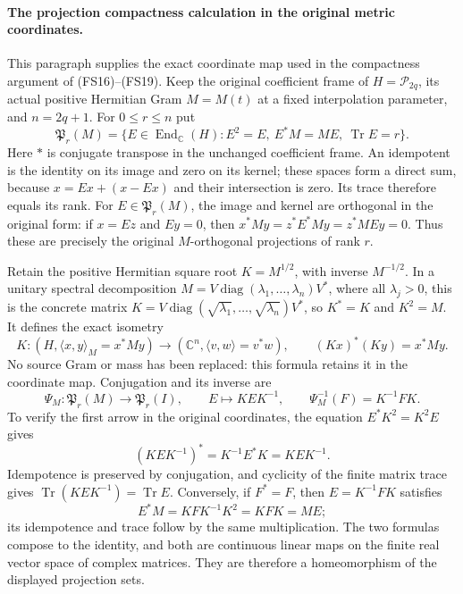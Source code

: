 \paragraph{The projection compactness calculation in the original metric coordinates.}
This paragraph supplies the exact coordinate map used in the compactness
argument of (FS16)--(FS19). Keep the original coefficient frame of
$H=\mathcal P_{2q}$, its actual positive Hermitian Gram $M=M(t)$ at a
fixed interpolation parameter, and $n=2q+1$. For $0\le r\le n$ put
\[
\mathfrak P_r(M)=
\{E\in\operatorname{End}_{\mathbb C}(H):
 E^2=E,\ E^*M=ME,\ \operatorname{Tr}E=r\}.
\]
Here $*$ is conjugate transpose in the unchanged coefficient frame.
An idempotent is the identity on its image and zero on its kernel;
these spaces form a direct sum, because
$x=Ex+(x-Ex)$ and their intersection is zero. Its trace therefore
equals its rank. For $E\in\mathfrak P_r(M)$, the image and kernel
are orthogonal in the original form: if $x=Ez$ and $Ey=0$, then
$x^*My=z^*E^*My=z^*MEy=0$. Thus these are precisely the
original $M$-orthogonal projections of rank $r$.

Retain the positive Hermitian square root $K=M^{1/2}$, with inverse
$M^{-1/2}$. In a unitary spectral decomposition
$M=V\operatorname{diag}(\lambda_1,\ldots,\lambda_n)V^*$,
where all $\lambda_j>0$, this is the concrete matrix
$K=V\operatorname{diag}(\sqrt{\lambda_1},\ldots,
\sqrt{\lambda_n})V^*$, so $K^*=K$ and $K^2=M$.
It defines the exact isometry
\[
K:(H,\langle x,y\rangle_M=x^*My)\longrightarrow
 (\mathbb C^n,\langle v,w\rangle=v^*w),
\qquad (Kx)^*(Ky)=x^*My.
\]
No source Gram or mass has been replaced: this formula retains it
in the coordinate map. Conjugation and its inverse are
\[
\Psi_M:\mathfrak P_r(M)\longrightarrow\mathfrak P_r(I),
\qquad E\longmapsto KEK^{-1},
\qquad
\Psi_M^{-1}(F)=K^{-1}FK.
\]
To verify the first arrow in the original coordinates, the equation
$E^*K^2=K^2E$ gives
\[
(KEK^{-1})^*=K^{-1}E^*K=KEK^{-1}.
\]
Idempotence is preserved by conjugation, and cyclicity of the finite
matrix trace gives $\operatorname{Tr}(KEK^{-1})=\operatorname{Tr}E$.
Conversely, if $F^*=F$, then $E=K^{-1}FK$ satisfies
\[
E^*M=KFK^{-1}K^2=KFK=ME;
\]
its idempotence and trace follow by the same multiplication.
The two formulas compose to the identity, and both are continuous
linear maps on the finite real vector space of complex matrices.
They are therefore a homeomorphism of the displayed projection sets.

